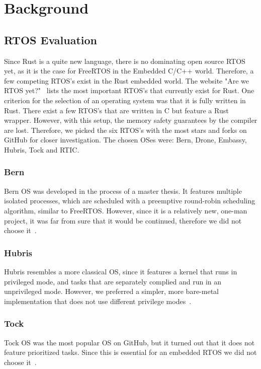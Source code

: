 \chapter{Background}
\label{ch:background}

\section{RTOS Evaluation}
\label{sec:rtos_evaluation}

Since Rust is a quite new language, there is no dominating open source RTOS yet, as it is the case for FreeRTOS in the Embedded C/C++ world.
Therefore, a few competing RTOS's exist in the Rust embedded world.
The website "Are we RTOS yet?"~\cite{AWRY} lists the most important RTOS's that currently exist for Rust.
One criterion for the selection of an operating system was that it is fully written in Rust.
There exist a few RTOS's that are written in C but feature a Rust wrapper.
However, with this setup, the memory safety guarantees by the compiler are lost.
Therefore, we picked the six RTOS's with the most stars and forks on GitHub for closer investigation. The chosen OSes were: Bern, Drone, Embassy, Hubris, Tock and RTIC. 

\subsection{Bern}
Bern OS was developed in the process of a master thesis. It features multiple isolated processes, which are scheduled with a preemptive round-robin scheduling algorithm, similar to FreeRTOS. However, since it is a relatively new, one-man project, it was far from sure that it would be continued, therefore we did not choose it~\cite{Bern}.

\subsection{Hubris}
Hubris resembles a more classical OS, since it features a kernel that runs in privileged mode, and tasks that are separately complied and run in an unprivileged mode. However, we preferred a simpler, more bare-metal implementation that does not use different privilege modes~\cite{Hubris}. 

\subsection{Tock}
Tock OS was the most popular OS on GitHub, but it turned out that it does not feature prioritized tasks. Since this is essential for an embedded RTOS we did not choose it~\cite{Tock}.


